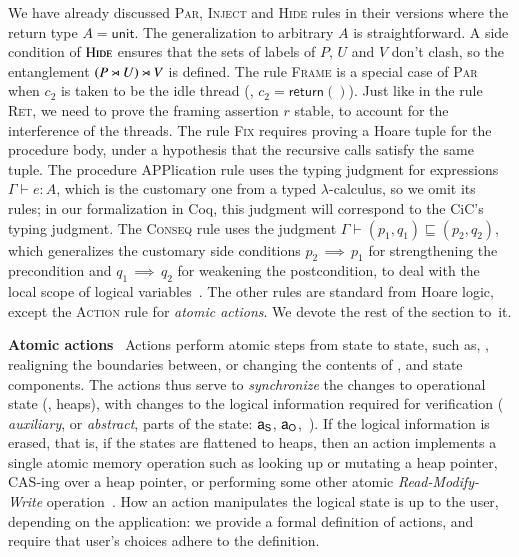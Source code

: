 We have already discussed \textsc{Par}, \textsc{Inject} and
\textsc{Hide} rules in their versions where the return type $A =
\mathsf{unit}$. The generalization to arbitrary $A$ is
straightforward.
%
A side condition of $\textsc{Hide}$ ensures that the sets of labels of
$P$, $U$ and $V$ don't clash, so the entanglement $(P \rtimes U)
\rtimes V$ is defined.
%
 The rule \textsc{Frame} is a special case of
\textsc{Par} when $c_2$ is taken to be the idle thread (\ie, $c_2 =
\mathsf{return} ()$). Just like in the rule \textsc{Ret}, we need to
prove the framing assertion $r$ stable, to account for the
interference of the \other threads. The rule \textsc{Fix} requires
proving a Hoare tuple for the procedure body, under a hypothesis that
the recursive calls satisfy the same tuple. The procedure
\textsc{APP}lication rule uses the typing judgment for expressions
$\Gamma \vdash e : A$, which is the customary one from a typed
$\lambda$-calculus, so we omit its rules; in our formalization in Coq,
this judgment will correspond to the CiC's typing judgment. The
\textsc{Conseq} rule uses the judgment $\Gamma \vdash (p_1, q_1)
\sqsubseteq (p_2, q_2)$, which generalizes the customary side
conditions $p_2\,{\implies}\,p_1$ for strengthening the precondition
and $q_1\,{\implies}\,q_2$ for weakening the postcondition, to deal
with the local scope of logical variables~\cite{fcsl-coqscripts}.
%
The other rules are standard from Hoare logic, except the
\textsc{Action} rule for \emph{atomic actions}. We devote the rest of
the section to~it.

\vspace{5pt}

\noindent\textbf{Atomic actions}~
%
Actions perform atomic steps from state to state, such as, \eg,
realigning the boundaries between, or changing the contents of \self,
\joint and \other state components. The actions thus serve to
\emph{synchronize} the changes to operational state (\ie, heaps), with
changes to the logical information required for verification (\ie
\emph{auxiliary}, or \emph{abstract}, parts of the state: $\mathsf{a}_{{\mathsf{S}}}$,
$\mathsf{a}_{{\mathsf{O}}}$,~\etc). If the logical information is erased, that is, if the
states are flattened to heaps, then an action implements a single
atomic memory operation such as looking up or mutating a heap pointer,
CAS-ing over a heap pointer, or performing some other atomic
\emph{Read-Modify-Write} operation~\cite[\S~5.6]{Herlihy-Shavit:08}.
%
How an action manipulates the logical state is up to the user,
depending on the application: we provide a formal definition of
actions, and require that user's choices adhere to the definition.

